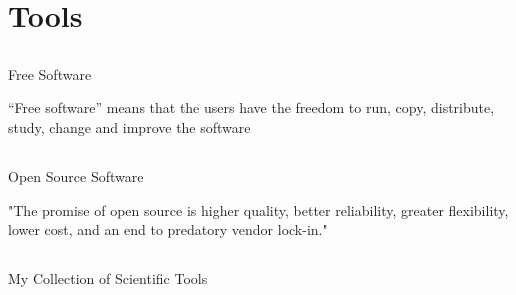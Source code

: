 \section{Tools}


\subsection{}
{

\begin{frame}{Free Software} 

“Free software” means that the users have the freedom 
to run, copy, distribute, study, change and improve the software

    \begin{figure}
   \end{figure}
	


\end{frame}
}


\subsection{}
{

\begin{frame}{Open Source Software} 

"The promise of open source is higher quality, better reliability, greater flexibility, lower cost, and an end to predatory vendor lock-in."


    \begin{figure}
   \end{figure}
	


\end{frame}
}



\subsection{}
{

\begin{frame}{My Collection of Scientific Tools} 

    \begin{figure}
   \end{figure}
	


\end{frame}
}





